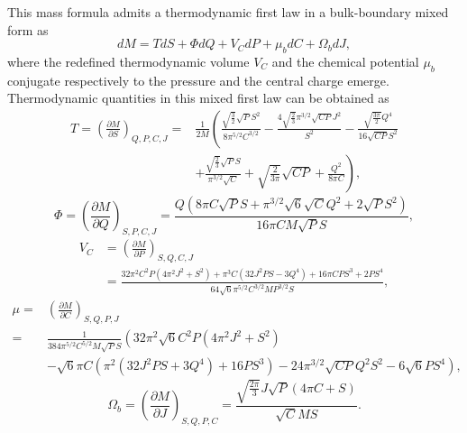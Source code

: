 \documentclass[a4paper,11pt]{article}
\begin{document}
This mass formula admits a thermodynamic first law in a bulk-boundary mixed form as
\begin{equation}\label{mifir}
d M=T d S+\Phi d Q+V_C d P+\mu_b d C+\Omega_b dJ,
\end{equation}
where the redefined thermodynamic volume  $V_C$ and the chemical potential  $\mu_b$ conjugate respectively to the pressure and the central charge emerge.  Thermodynamic quantities in this mixed first law can be obtained as
\begin{equation}
\begin{aligned}
T=\left(\frac{\partial M}{\partial S}\right)_{Q, P, C, J}=&\frac{1}{2M}\left(\frac{\sqrt{\frac{3}{2}} \sqrt{P} S^2}{8 \pi ^{5/2} C^{3/2}}-\frac{4 \sqrt{\frac{2}{3}} \pi ^{3/2} \sqrt{CP} J^2 }{S^2}-\frac{\sqrt{\frac{3 \pi }{2}} Q^4}{16 \sqrt{CP}  S^2}\right.\\&\left.+\frac{\sqrt{\frac{2}{3}} \sqrt{P} S}{\pi ^{3/2} \sqrt{C}}+\sqrt{\frac{2}{3 \pi }} \sqrt{CP} +\frac{Q^2}{8 \pi  C}\right),
\end{aligned}
\end{equation}
\begin{equation}
\Phi=\left(\frac{\partial M}{\partial Q}\right)_{S, P, C, J}=\frac{Q \left(8 \pi  C \sqrt{P} S+\pi ^{3/2} \sqrt{6} \sqrt{C} Q^2+2 \sqrt{P} S^2\right)}{16 \pi  C M \sqrt{P} S},
\end{equation}
\begin{equation}
\begin{aligned}
V_C&=\left(\frac{\partial M}{\partial P}\right)_{S, Q, C, J}\\&=\frac{32 \pi ^2 C^2 P \left(4 \pi ^2 J^2+S^2\right)+\pi ^3 C \left(32 J^2 P S-3 Q^4\right)+16 \pi  C P S^3+2 P S^4}{64 \sqrt{6} \pi ^{5/2} C^{3/2} M P^{3/2} S},
\end{aligned}
\end{equation}
\begin{equation}
\begin{aligned}
\mu=&\left(\frac{\partial M}{\partial C}\right)_{S, Q, P, J}\\=&\frac{1}{384 \pi ^{5/2} C^{5/2} M \sqrt{P} S}\left(32 \pi ^2 \sqrt{6} C^2 P \left(4 \pi ^2 J^2+S^2\right)\right.\\&\left.-\sqrt{6} \pi  C \left(\pi ^2 \left(32 J^2 P S+3 Q^4\right)+16 P S^3\right)-24 \pi ^{3/2} \sqrt{CP}  Q^2 S^2-6 \sqrt{6} P S^4\right),
\end{aligned}
\end{equation}
\begin{equation}
\Omega_b=\left(\frac{\partial M}{\partial J}\right)_{S, Q, P, C}=\frac{\sqrt{\frac{2 \pi }{3}} J \sqrt{P} (4 \pi  C+S)}{\sqrt{C} M S}.
\end{equation}
\end{document}
